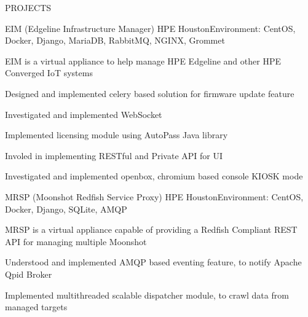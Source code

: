 \documentclass{resume} %
\begin{document}


\begin{rSection}{PROJECTS}


\begin{rSubsection}{EIM (Edgeline Infrastructure Manager)}
{HPE Houston}{Environment: CentOS, Docker, Django,  MariaDB, RabbitMQ, NGINX, Grommet}{ }  %

\vspace{-3pt}

\item EIM is a virtual appliance to help manage HPE Edgeline and other HPE Converged IoT systems
\item Designed and implemented celery based solution for firmware update feature
\item Investigated and implemented WebSocket
\item Implemented licensing module using AutoPass Java library
\item Involed in implementing RESTful and Private API for UI
\item Investigated and implemented openbox, chromium based console KIOSK mode

\end{rSubsection}


\begin{rSubsection}{MRSP (Moonshot Redfish Service Proxy)}
{HPE Houston}{Environment: CentOS, Docker, Django,  SQLite, AMQP}{ }  %

\vspace{-3pt}

\item MRSP is a virtual appliance capable of providing a Redfish Compliant REST API for managing multiple Moonshot
\item Understood and implemented AMQP based eventing feature, to notify Apache Qpid Broker
\item Implemented multithreaded scalable dispatcher module, to crawl data from managed targets


\end{rSubsection}
\end{rSection}
\end{document}
